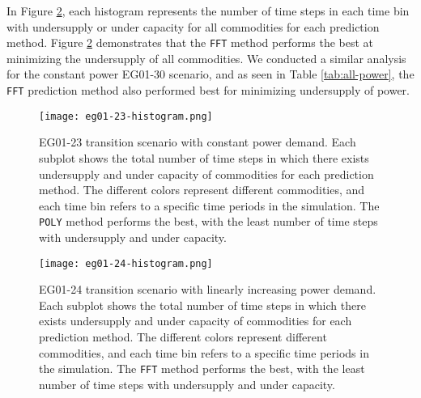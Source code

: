 In Figure \ref{fig:eg24under}, each histogram represents 
the number of time steps in each time bin with undersupply or 
under capacity for all commodities for each prediction method.
Figure \ref{fig:eg24under} demonstrates that the \texttt{FFT} method 
performs the best at minimizing the undersupply of all commodities.
We conducted a similar analysis for the constant power EG01-30 scenario, and 
as seen in Table \ref{tab:all-power}, the \texttt{FFT} prediction method also performed 
best for minimizing undersupply of power. 

\begin{figure}[]
	\centering
	\texttt{[image: eg01-23-histogram.png]} 
	\caption{
	EG01-23 transition scenario with constant power demand. 
	Each subplot shows the total number of time steps in which there exists 
	undersupply and under capacity of commodities for each prediction method. 
	The different colors represent different commodities, and each time bin 
	refers to a specific time periods in the simulation.
	The \texttt{POLY} method performs the best, with the least number of 
	time steps with undersupply and under capacity.}
	\label{fig:eg23under}
\end{figure}

\begin{figure}[]
	\centering
	\texttt{[image: eg01-24-histogram.png]} 
	\caption{
	EG01-24 transition scenario with linearly increasing power demand. 
	Each subplot shows the total number of time steps in which there exists 
	undersupply and under capacity of commodities for each prediction method. 
	The different colors represent different commodities, and each time bin 
	refers to a specific time periods in the simulation.
	The \texttt{FFT} method performs the best, with the least number of 
	time steps with undersupply and under capacity.}
	\label{fig:eg24under}
\end{figure}

